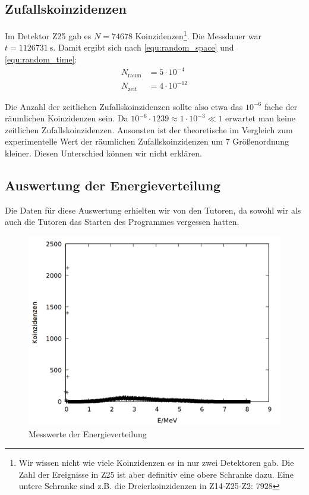 \subsection{Zufallskoinzidenzen}
Im Detektor Z25 gab es $N = 74678$ Koinzidenzen\footnote{Wir wissen nicht wie viele Koinzidenzen es in nur zwei Detektoren gab. Die Zahl der Ereignisse in Z25 ist aber definitiv eine obere Schranke dazu. Eine untere Schranke sind z.B. die Dreierkoinzidenzen in Z14-Z25-Z2: $7928$}. Die Messdauer war $t = \SI{1126731}{\second}$. Damit ergibt sich nach \ref{equ:random_space} und \ref{equ:random_time}:\\
\begin{align*}
N_{\text{raum}} &= 5 \cdot 10^{-4}\\
N_{\text{zeit}} &= 4 \cdot 10^{-12}
\end{align*}

Die Anzahl der zeitlichen Zufallskoinzidenzen sollte also etwa das $10^{-6}$ fache der räumlichen Koinzidenzen sein. Da $10^{-6} \cdot 1239 \approx 1 \cdot 10^{-3} \ll 1$ erwartet man keine zeitlichen Zufallskoinzidenzen. Ansonsten ist der theoretische im Vergleich zum experimentelle Wert der räumlichen Zufallskoinzidenzen um 7 Größenordnung kleiner. Diesen Unterschied können wir nicht erklären.  
 
\subsection{Auswertung der Energieverteilung}

Die Daten für diese Auswertung erhielten wir von den Tutoren, da sowohl wir als auch die Tutoren das Starten des Programmes vergessen hatten.\\

\begin{figure}
\centering
\includegraphics[width=0.75\linewidth]{data/friedrich/mca_raw.png}
\caption{Messwerte der Energieverteilung}
\label{fig:mca_raw}
\end{figure}

